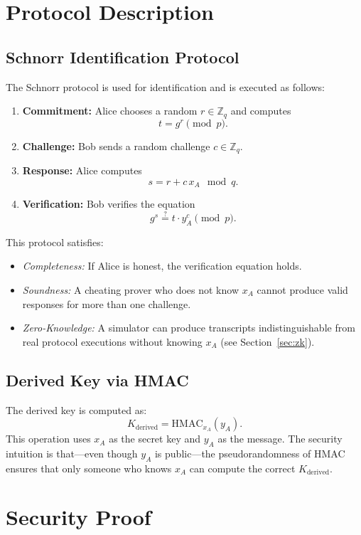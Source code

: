\documentclass{article}
\begin{document}
\section{Protocol Description}

\subsection{Schnorr Identification Protocol}
The Schnorr protocol is used for identification and is executed as follows:
\begin{enumerate}
    \item \textbf{Commitment:} Alice chooses a random \(r \in \mathbb{Z}_q\) and computes 
    \[
    t = g^r \pmod{p}.
    \]
    \item \textbf{Challenge:} Bob sends a random challenge \(c \in \mathbb{Z}_q\).
    \item \textbf{Response:} Alice computes 
    \[
    s = r + c\,x_A \mod q.
    \]
    \item \textbf{Verification:} Bob verifies the equation
    \[
    g^s \stackrel{?}{=} t \cdot y_A^c \pmod{p}.
    \]
\end{enumerate}
This protocol satisfies:
\begin{itemize}
    \item \emph{Completeness:} If Alice is honest, the verification equation holds.
    \item \emph{Soundness:} A cheating prover who does not know \(x_A\) cannot produce valid responses for more than one challenge.
    \item \emph{Zero-Knowledge:} A simulator can produce transcripts indistinguishable from real protocol executions without knowing \(x_A\) (see Section~\ref{sec:zk}).
\end{itemize}

\subsection{Derived Key via HMAC}
The derived key is computed as:
\[
K_{\text{derived}} = \mathrm{HMAC}_{x_A}(y_A).
\]
This operation uses \(x_A\) as the secret key and \(y_A\) as the message. The security intuition is that—even though \(y_A\) is public—the pseudorandomness of HMAC ensures that only someone who knows \(x_A\) can compute the correct \(K_{\text{derived}}\).

\section{Security Proof}
\end{document}
